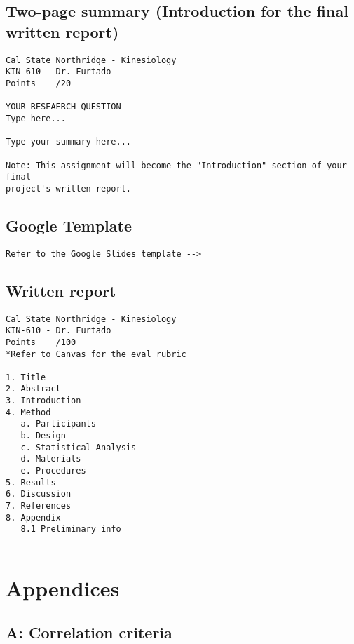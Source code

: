 \documentclass[
]{article}
\begin{document}
\hypertarget{two-page-summary-introduction-for-the-final-written-report}{%
\subsection{Two-page summary (Introduction for the final written report)}\label{two-page-summary-introduction-for-the-final-written-report}}

\begin{verbatim}
Cal State Northridge - Kinesiology
KIN-610 - Dr. Furtado
Points ___/20

YOUR RESEAERCH QUESTION
Type here...

Type your summary here...

Note: This assignment will become the "Introduction" section of your final 
project's written report.
\end{verbatim}

\hypertarget{google-template}{%
\subsection{Google Template}\label{google-template}}

\begin{verbatim}
Refer to the Google Slides template --> 
\end{verbatim}

\hypertarget{written-report}{%
\subsection{Written report}\label{written-report}}

\begin{verbatim}
Cal State Northridge - Kinesiology
KIN-610 - Dr. Furtado
Points ___/100
*Refer to Canvas for the eval rubric

1. Title
2. Abstract
3. Introduction
4. Method
   a. Participants
   b. Design
   c. Statistical Analysis
   d. Materials
   e. Procedures
5. Results
6. Discussion
7. References
8. Appendix
   8.1 Preliminary info
   
\end{verbatim}

\hypertarget{appendices}{%
\section{Appendices}\label{appendices}}

\hypertarget{appendix-a}{%
\subsection{A: Correlation criteria}\label{appendix-a}}
\end{document}
